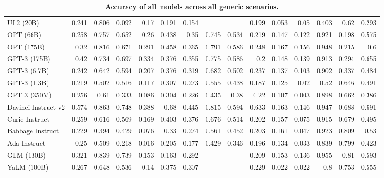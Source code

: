 \begin{table}[htp]
{\begin{tabular}{lrrrrrrrrrrrrrr}
UL2 (20B) & 0.241 & 0.806 & 0.092 & 0.17 & 0.191 & 0.154 &  &  & 0.199 & 0.053 & 0.05 & 0.403 & 0.62 & 0.293 \\
OPT (66B) & 0.258 & 0.757 & 0.652 & 0.26 & 0.438 & 0.35 & 0.745 & 0.534 & 0.219 & 0.147 & 0.122 & 0.921 & 0.198 & 0.575 \\
OPT (175B) & 0.32 & 0.816 & 0.671 & 0.291 & 0.458 & 0.365 & 0.791 & 0.586 & 0.248 & 0.167 & 0.156 & 0.948 & 0.215 & 0.6 \\
GPT-3 (175B) & 0.42 & 0.734 & 0.697 & 0.334 & 0.376 & 0.355 & 0.775 & 0.586 & 0.2 & 0.148 & 0.139 & 0.913 & 0.294 & 0.655 \\
GPT-3 (6.7B) & 0.242 & 0.642 & 0.594 & 0.207 & 0.376 & 0.319 & 0.682 & 0.502 & 0.237 & 0.137 & 0.103 & 0.902 & 0.337 & 0.484 \\
GPT-3 (1.3B) & 0.219 & 0.502 & 0.516 & 0.117 & 0.307 & 0.273 & 0.555 & 0.438 & 0.187 & 0.125 & 0.02 & 0.52 & 0.646 & 0.491 \\
GPT-3 (350M) & 0.256 & 0.61 & 0.333 & 0.086 & 0.304 & 0.226 & 0.435 & 0.38 & 0.22 & 0.107 & 0.003 & 0.898 & 0.662 & 0.386 \\
Davinci Instruct v2 & 0.574 & 0.863 & 0.748 & 0.388 & 0.68 & 0.445 & 0.815 & 0.594 & 0.633 & 0.163 & 0.146 & 0.947 & 0.688 & 0.691 \\
Curie Instruct & 0.259 & 0.616 & 0.569 & 0.169 & 0.403 & 0.376 & 0.676 & 0.514 & 0.202 & 0.157 & 0.075 & 0.915 & 0.679 & 0.495 \\
Babbage Instruct & 0.229 & 0.394 & 0.429 & 0.076 & 0.33 & 0.274 & 0.561 & 0.452 & 0.203 & 0.161 & 0.047 & 0.923 & 0.809 & 0.53 \\
Ada Instruct & 0.25 & 0.509 & 0.218 & 0.016 & 0.205 & 0.177 & 0.429 & 0.346 & 0.196 & 0.134 & 0.033 & 0.839 & 0.799 & 0.423 \\
GLM (130B) & 0.321 & 0.839 & 0.739 & 0.153 & 0.163 & 0.292 &  &  & 0.209 & 0.153 & 0.136 & 0.955 & 0.81 & 0.593 \\
YaLM (100B) & 0.267 & 0.648 & 0.536 & 0.14 & 0.375 & 0.307 &  &  & 0.229 & 0.022 & 0.022 & 0.8 & 0.753 & 0.555 \\
\bottomrule
\end{tabular}}
\caption{\textbf{Accuracy of all models across all generic scenarios.}}
\label{tab:accuracy-generic}
\end{table}